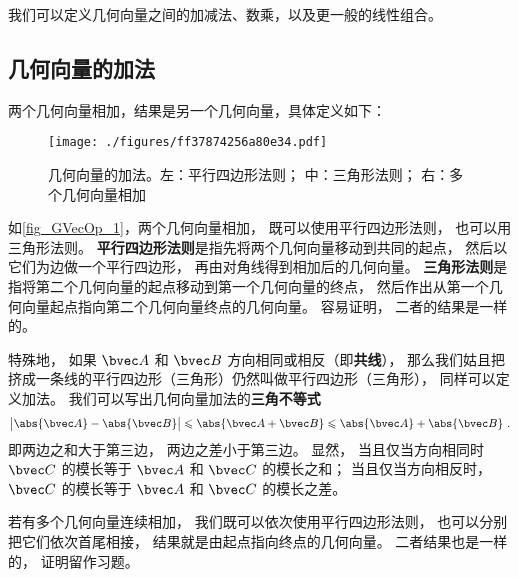 

% 


我们可以定义几何向量之间的加减法、数乘，以及更一般的线性组合。

\subsection{几何向量的加法}
两个几何向量相加，结果是另一个几何向量，具体定义如下：
\begin{figure}[ht]
\centering
\texttt{[image: ./figures/ff37874256a80e34.pdf]}
\caption{几何向量的加法。左：平行四边形法则； 中：三角形法则； 右：多个几何向量相加} \label{fig_GVecOp_1}
\end{figure}
如\autoref{fig_GVecOp_1}，两个几何向量相加， 既可以使用平行四边形法则， 也可以用三角形法则。 \textbf{平行四边形法则}是指先将两个几何向量移动到共同的起点， 然后以它们为边做一个平行四边形， 再由对角线得到相加后的几何向量。 \textbf{三角形法则}是指将第二个几何向量的起点移动到第一个几何向量的终点， 然后作出从第一个几何向量起点指向第二个几何向量终点的几何向量。 容易证明， 二者的结果是一样的。

特殊地， 如果 $\bvec A$ 和 $\bvec B$ 方向相同或相反（即\textbf{共线}）， 那么我们姑且把挤成一条线的平行四边形（三角形）仍然叫做平行四边形（三角形）， 同样可以定义加法。 我们可以写出几何向量加法的\textbf{三角不等式}
\begin{equation}
\big|\abs{\bvec A} - \abs{\bvec B}\big| \leqslant \abs{\bvec A + \bvec B} \leqslant \abs{\bvec A} + \abs{\bvec B}~.
\end{equation}
即两边之和大于第三边， 两边之差小于第三边。 显然， 当且仅当方向相同时 $\bvec C$ 的模长等于 $\bvec A$ 和 $\bvec C$ 的模长之和； 当且仅当方向相反时， $\bvec C$ 的模长等于 $\bvec A$ 和 $\bvec C$ 的模长之差。 

若有多个几何向量连续相加， 我们既可以依次使用平行四边形法则， 也可以分别把它们依次首尾相接， 结果就是由起点指向终点的几何向量。 二者结果也是一样的， 证明留作习题。

